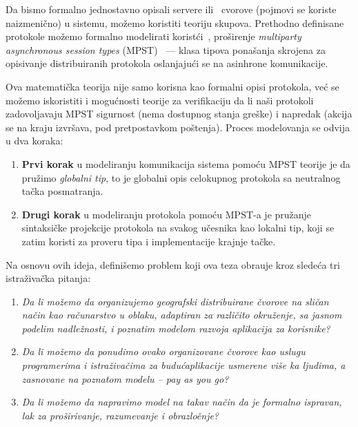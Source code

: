 Da bismo formalno jednostavno opisali servere ili \ cvorove (pojmovi se koriste naizmeni\v cno) u sistemu, mo\v zemo koristiti teoriju skupova. Prethodno definisane protokole mo\v zemo formalno modelirati korist\'ci~\cite {HuY17}, pro\v sirenje \emph{multiparty asynchronous session types} (MPST)~\cite {HondaYC08} --- klasa tipova pona\v sanja skrojena za opisivanje distribuiranih protokola oslanjaju\'ci se na asinhrone komunikacije.

Ova matemati\v cka teorija nije samo korisna kao formalni opisi protokola, ve\'c se mo\v zemo iskoristiti i mogu\'cnosti teorije za verifikaciju da li na\v si protokoli zadovoljavaju MPST sigurnost (nema dostupnog stanja gre\v ske) i napredak (akcija se na kraju izvr\v sava, pod pretpostavkom po\v stenja). Proces modelovanja se odvija u dva koraka:

\begin{enumerate}[start=1,label={(\bfseries \arabic*)}]
	\item \textbf{Prvi korak} u modeliranju komunikacija sistema pomoću MPST teorije je da pru\v zimo \emph{globalni tip}, to je globalni opis celokupnog protokola sa neutralnog ta\v cka posmatranja.
	\item \textbf{Drugi korak} u modeliranju protokola pomo\'cu MPST-a je pru\v zanje sintaksi\v cke projekcije protokola na svakog u\v cesnika kao lokalni tip, koji se zatim koristi za proveru tipa i implementacije krajnje ta\v cke.
\end{enumerate}

Na osnovu ovih ideja, definišemo problem koji ova teza obra\dj uje kroz slede\'ca tri istra\v ziva\v cka pitanja:

\begin{enumerate}[start=1,label={(\bfseries \arabic*)}]\label{rez:questions}
	\item \textit{Da li mo\v zemo da organizujemo geografski distribuirane \v cvorove na sli\v can na\v cin kao ra\v cunarstvo u oblaku, adaptiran za razli\v cito okru\v zenje, sa jasnom podelim nadle\v znosti, i poznatim modelom razvoja aplikacija za korisnike?}
	\item \textit{Da li mo\v zemo da ponudimo ovako organizovane \v cvorove kao uslugu programerima i istra\v ziva\v cima za budu\'caplikacije usmerene vi\v se ka ljudima, a zasnovane na poznatom modelu -- pay as you go?}
	\item \textit{Da li mo\v zemo da napravimo model na takav na\v cin da je formalno ispravan, lak za pro\v sirivanje, razumevanje i obrazlo\v enje?}
\end{enumerate}

